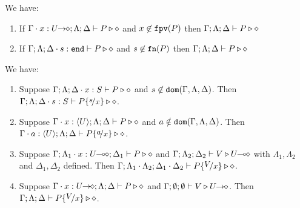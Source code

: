 \begin{lemma}\rm
	\label{l:stren}
	We have:
	\begin{enumerate}[$-$]
		\item	If $\Gamma \cdot x: U\!\! \rightarrow\!\! \diamond; \Lambda; \Delta \vdash P \triangleright \diamond$
			and
			$x \not\in \mathtt{fpv}(P)$ then
			$\Gamma; \Lambda; \Delta \vdash P \triangleright \diamond$

		\item	If $\Gamma; \Lambda; \Delta \cdot s: \mathtt{end} \vdash P \triangleright \diamond$
			and
			$s \not\in \mathtt{fn}(P)$
			then
			$\Gamma; \Lambda; \Delta \vdash P \triangleright \diamond$
	\end{enumerate}
\end{lemma}

\begin{lemma}\rm
	\label{l:subst}
	We have:
	\begin{enumerate}[1.]
		\item	Suppose $\Gamma; \Lambda; \Delta \cdot x:S  \vdash P \triangleright \diamond$ and
			$s \not\in \mathtt{dom}(\Gamma, \Lambda, \Delta)$. 
			Then $\Gamma; \Lambda; \Delta \cat s:S  \vdash P\subst{s}{x} \hastype \Proc$.

		\item	Suppose $\Gamma \cdot x:\langle U \rangle; \Lambda; \Delta \vdash P \triangleright \diamond$ and
			$a \notin \mathtt{dom}(\Gamma, \Lambda, \Delta)$. 
			Then $\Gamma \cat a:\chtype{U}; \Lambda; \Delta   \vdash P\subst{a}{x} \hastype \Proc$.

		\item	Suppose $\Gamma; \Lambda_1 \cdot x:U\!\! \multimap\!\! \diamond; \Delta_1  \vdash P \triangleright \diamond$ 
			and $\Gamma; \Lambda_2; \Delta_2  \vdash V \triangleright U\!\! \multimap\!\! \diamond$ with 
			$\Lambda_1, \Lambda_2$ and $\Delta_1, \Delta_2$ defined.  
			Then $\Gamma; \Lambda_1 \cat \Lambda_2; \Delta_1 \cat \Delta_2  \proves P\subst{V}{x} \hastype \Proc$.

		\item	Suppose $\Gamma \cdot x:U\!\! \rightarrow\!\! \diamond; \Lambda; \Delta  \vdash P \triangleright \diamond$ and
			$\Gamma; \emptyset ; \emptyset  \vdash V \triangleright U\!\! \rightarrow\!\! \diamond$.
			Then $\Gamma; \Lambda; \Delta  \proves P\subst{V}{x} \hastype \Proc$.
		\end{enumerate}
\end{lemma}

